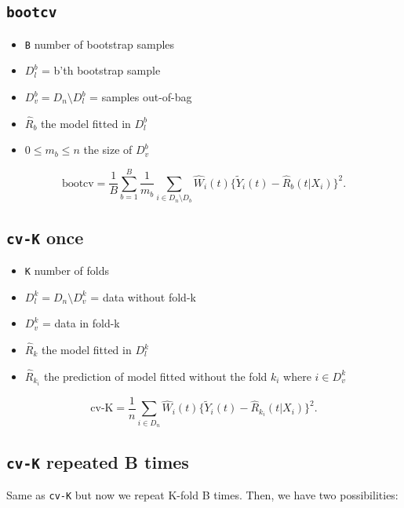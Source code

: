 \documentclass{article}
\begin{document}
\subsection{\texttt{bootcv}}
\label{sec:orgbd605e7}

\begin{itemize}
\item \texttt{B} number of bootstrap samples
\item \(D_l^b\) = b'th bootstrap sample
\item \(D_v^b=D_n \setminus D_l^b\)  = samples out-of-bag
\item \(\hat R_b\) the model fitted in \(D_l^b\)
\item \(0\le m_b \le n\) the size of \(D_v^b\)
\end{itemize}

\begin{equation*}
  \text{bootcv}= \frac 1 B \sum_{b=1}^B\frac{1}{m_b}
  \sum_{i\in D_n\setminus D_b}\hat
  W_i(t) \{\tilde Y_i(t)-\hat R_b(t|X_i)\}^2.
\end{equation*}

\subsection{\texttt{cv-K} once}
\label{sec:orga6466c8}

\begin{itemize}
\item \texttt{K} number of folds
\item \(D_l^k=D_n \setminus D_v^k\) = data without fold-k
\item \(D_v^k\)  = data in fold-k
\item \(\hat R_k\) the model fitted in \(D_l^k\)
\item \(\hat R_{k_i}\) the prediction of model fitted without the fold \(k_i\) where \(i\in D_v^k\)
\end{itemize}

\begin{equation*}
\text{cv-K}=  \frac{1}{n} \sum_{i\in D_n}
  \hat W_i(t) \{\tilde Y_i(t)-\hat R_{k_i}(t|X_i)\}^2.
\end{equation*}

\subsection{\texttt{cv-K} repeated B times}
\label{sec:org342b9f1}

Same as \texttt{cv-K} but now we repeat K-fold B times. Then, we have two
possibilities:
\end{document}
